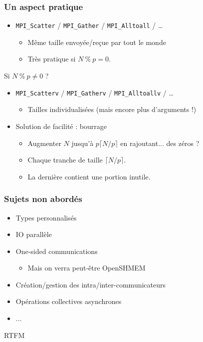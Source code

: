 \documentclass[xcolor={x11names,svgnames}]{beamer}
\begin{document}
\begin{frame}[fragile]
\frametitle{Un aspect pratique}

\begin{itemize}
\item \verb|MPI_Scatter| / \verb|MPI_Gather| / \verb|MPI_Alltoall| / \dots
  \begin{itemize}
  \item Même taille envoyée/reçue par tout le monde
  \item Très pratique si $N ~ \% ~ p = 0$.
  \end{itemize}
\end{itemize}

\medskip

\begin{alertblock}{Si $N ~ \% ~ p \neq 0$ ?}
\begin{itemize}
\item \verb|MPI_Scatterv| / \verb|MPI_Gatherv| /  \verb|MPI_Alltoallv| / \dots
  \begin{itemize}
  \item Tailles individualisées (mais encore plus d'arguments !)
  \end{itemize}
  
\medskip
  
\item Solution de facilité : bourrage
  \begin{itemize}
  \item Augmenter $N$ jusqu'à $p \lceil N/p \rceil$ en rajoutant... des zéros ? 
  \item Chaque \og tranche \fg de taille $\lceil N/p \rceil$.
  \item La dernière contient une portion inutile.
  \end{itemize}

\end{itemize}
\end{alertblock}
\end{frame}


\begin{frame}
\frametitle{Sujets non abordés}

\begin{itemize}
\item Types personnalisés
\item IO parallèle
\item One-sided communications
  \begin{itemize}
  \item Mais on verra peut-être OpenSHMEM
  \end{itemize}
\item Création/gestion des intra/inter-communicateurs
\item Opérations collectives asynchrones
\item $\dots$
\end{itemize}

\bigskip
\pause
\Huge RTFM
\end{frame}
\end{document}
